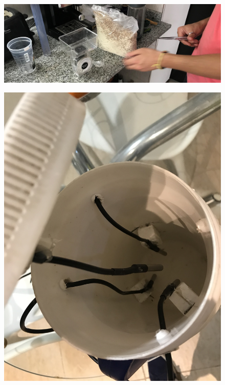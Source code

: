     \begin{figure}
        \centering
        \includegraphics[scale=0.10]{Anexo/FotosExperimentos/P2.jpg}
        \label{fig:FragInsumos}
    \end{figure}
        
    \begin{figure}
        \centering
        \includegraphics[scale=0.10]{Anexo/FotosExperimentos/tanque-nuevoP3.jpg}
        \label{fig:ConstrucMacerador}
    \end{figure}
    
